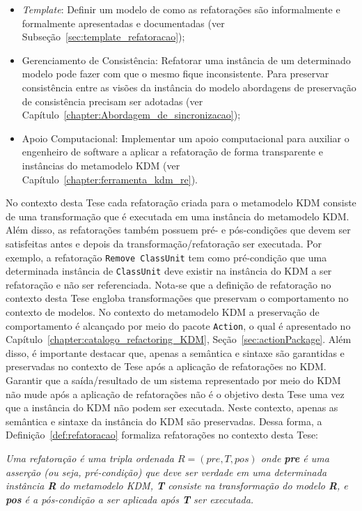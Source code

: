\begin{itemize}
\item \textit{Template}: Definir um modelo de como as refatorações são informalmente e formalmente apresentadas e documentadas (ver Subseção~\ref{sec:template_refatoracao});

\item Gerenciamento de Consistência: Refatorar uma instância de um determinado modelo pode fazer com que o mesmo fique inconsistente. Para preservar consistência entre as visões da instância do modelo abordagens de preservação de consistência precisam ser adotadas (ver Capítulo~\ref{chapter:Abordagem_de_sincronizacao});

\item Apoio Computacional: Implementar um apoio computacional para auxiliar o engenheiro de software a aplicar a refatoração de forma transparente e instâncias do metamodelo KDM (ver Capítulo~\ref{chapter:ferramenta_kdm_re}).
\end{itemize}

No contexto desta Tese cada refatoração criada para o metamodelo KDM consiste de uma transformação que é executada em uma instância do metamodelo KDM. Além disso, as refatorações também possuem pré- e pós-condições que devem ser satisfeitas antes e depois da transformação/refatoração ser executada. Por exemplo, a refatoração \texttt{Remove ClassUnit} tem como pré-condição que uma determinada instância de \texttt{ClassUnit} deve existir na instância do KDM a ser refatoração e não ser referenciada. Nota-se que a definição de refatoração no contexto desta Tese engloba transformações que preservam o comportamento no contexto de modelos. No contexto do metamodelo KDM a preservação de comportamento é alcançado por meio do pacote \texttt{Action}, o qual é apresentado no Capítulo~\ref{chapter:catalogo_refactoring_KDM}, Seção~\ref{sec:actionPackage}. Além disso, é importante destacar que, apenas a semântica e sintaxe são garantidas e preservadas no contexto de Tese após a aplicação de refatorações no KDM. Garantir que a saída/resultado de um sistema representado por meio do KDM não mude após a aplicação de refatorações não é o objetivo desta Tese uma vez que a instância do KDM não podem ser executada. Neste contexto, apenas as semântica e sintaxe da instância do KDM são preservadas. Dessa forma, a Definição~\ref{def:refatoracao} formaliza refatorações no contexto desta Tese:


\begin{definicao}\label{def:refatoracao}
    \textit{Uma refatoração é uma tripla ordenada $R = (pre, T, pos)$ onde \textbf{pre} é uma asserção (ou seja, pré-condição) que deve ser verdade em uma determinada instância \textbf{R} do metamodelo KDM, \textbf{T} consiste na transformação do modelo \textbf{R}, e \textbf{pos} é a pós-condição a ser aplicada após \textbf{T} ser executada.}
\end{definicao}


